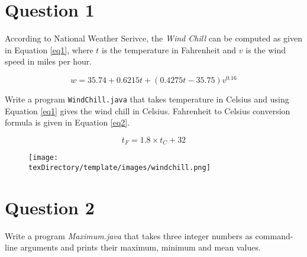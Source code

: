 \documentclass[12pt,letterpaper,twoside]{article}
\begin{document}


\section*{Question 1}

According to National Weather Serivce, the \textit{Wind Chill} can be computed as given in Equation \ref{eq1}, where $t$ is the temperature in Fahrenheit and $v$ is the wind speed in miles per hour.

\begin{equation}
w = 35.74 + 0.6215 t + (0.4275t-35.75)v^{0.16}
\label{eq1}
\end{equation}

Write a program \texttt{WindChill.java} that takes temperature in Celsius and using Equation \ref{eq1} gives the wind chill in Celsius.
Fahrenheit to Celsius conversion formula is given in Equation \ref{eq2}.

\begin{equation}
t_F = 1.8 \times t_C + 32
\label{eq2}
\end{equation}

\begin{figure}[H]\centering
	\texttt{[image: \\texDirectory/template/images/windchill.png]}
\end{figure}

\section*{Question 2}

Write a program \textit{Maximum.java} that takes three integer numbers as command-line arguments and prints their maximum, minimum and mean values.

\end{document}

